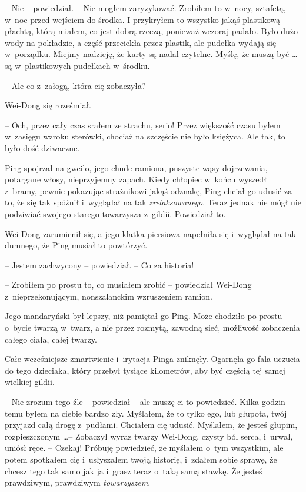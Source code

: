 \documentclass[oneside,polish,11pt,rmheadings]{mwbk}
\begin{document}
-- Nie -- powiedział. -- Nie mogłem zaryzykować. Zrobiłem to w~nocy, sztafetą, w~noc przed wejściem do środka. I przykryłem to wszystko jakąś plastikową płachtą, którą miałem, co jest dobrą rzeczą, ponieważ wczoraj padało. Było dużo wody na pokładzie, a część przeciekła przez plastik, ale pudełka wydają się w~porządku. Miejmy nadzieję, że karty są nadal czytelne. Myślę, że muszą być  \ldots  są w~plastikowych pudełkach w~środku.

-- Ale co z~załogą, która cię zobaczyła?

Wei-Dong się roześmiał. 

-- Och, przez cały czas srałem ze strachu, serio! Przez większość czasu byłem w~zasięgu wzroku sterówki, chociaż na szczęście nie było księżyca. Ale tak, to było dość dziwaczne.

Ping spojrzał na gweilo, jego chude ramiona, puszyste wąsy dojrzewania, potargane włosy, nieprzyjemny zapach. Kiedy chłopiec w~końcu wyszedł z~bramy, pewnie pokazując strażnikowi jakąś odznakę, Ping chciał go udusić za to, że się tak spóźnił i~wyglądał na tak \textit{zrelaksowanego}. Teraz jednak nie mógł nie podziwiać swojego starego towarzysza z~gildii. Powiedział to.

Wei-Dong zarumienił się, a jego klatka piersiowa napełniła się i~wyglądał na tak dumnego, że Ping musiał to powtórzyć. 

-- Jestem zachwycony -- powiedział. -- Co za historia! 

-- Zrobiłem po prostu to, co musiałem zrobić -- powiedział Wei-Dong z~nieprzekonującym, nonszalanckim wzruszeniem ramion. 

Jego mandaryński był lepszy, niż pamiętał go Ping. Może chodziło po prostu o~bycie twarzą w~twarz, a nie przez rozmytą, zawodną sieć, możliwość zobaczenia całego ciała, całej twarzy.

Całe wcześniejsze zmartwienie i~irytacja Pinga zniknęły. Ogarnęła go fala uczucia do tego dzieciaka, który przebył tysiące kilometrów, aby być częścią tej samej wielkiej gildii. 

-- Nie zrozum tego źle -- powiedział -- ale muszę ci to powiedzieć. Kilka godzin temu byłem na ciebie bardzo zły. Myślałem, że to tylko ego, lub głupota, twój przyjazd całą drogę z~pudłami. Chciałem cię udusić. Myślałem, że jesteś głupim, rozpieszczonym \ldots  -- Zobaczył wyraz twarzy Wei-Dong, czysty ból serca, i~urwał, uniósł ręce. -- Czekaj! Próbuję powiedzieć, że myślałem o~tym wszystkim, ale potem spotkałem cię i~usłyszałem twoją historię, i~zdałem sobie sprawę, że chcesz tego tak samo jak ja i~grasz teraz o~taką samą stawkę. Że jesteś prawdziwym, prawdziwym \textit{towarzyszem}. 
\end{document}
